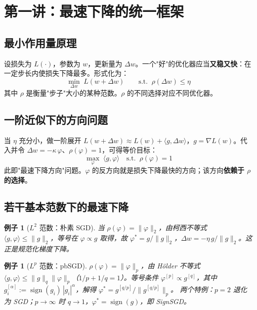 \documentclass[11pt,a4paper]{article}
\theoremstyle{mythm}
\theoremstyle{mydef}
\newtheorem{example}[theorem]{例子}
\newcommand{\sign}{\operatorname{sign}}
\newcommand{\inner}[2]{\langle #1, #2 \rangle}
\begin{document}
\section{第一讲：最速下降的统一框架}\label{sec:framework}

\subsection{最小作用量原理}

设损失为 $L(\cdot)$，参数为 $w$，更新量为 $\Delta w$。一个"好"的优化器应当\textbf{又稳又快}：在一定步长内使损失下降最多。形式化为：
\begin{equation}\label{eq:min-action}
\min_{\Delta w}\; L(w+\Delta w)
\qquad
\text{s.t.}\;\; \rho(\Delta w)\le \eta
\end{equation}
其中 $\rho$ 是衡量"步子"大小的某种范数。$\rho$ 的不同选择对应不同优化器。

\subsection{一阶近似下的方向问题}

当 $\eta$ 充分小，做一阶展开 $L(w+\Delta w)\approx L(w)+\inner{g}{\Delta w}$，$g=\nabla L(w)$。代入并令 $\Delta w = -\kappa\,\varphi$、$\rho(\varphi)=1$，可得等价目标：
\begin{equation}\label{eq:direction}
\boxed{\quad\max_\varphi\; \inner{g}{\varphi}\quad \text{s.t.}\;\; \rho(\varphi)=1\quad}
\end{equation}
此即"最速下降方向"问题。$\varphi$ 的反方向就是损失下降最快的方向；该方向\textbf{依赖于 $\rho$ 的选择}。

\subsection{若干基本范数下的最速下降}

\begin{example}[$L^2$ 范数：朴素 SGD]
当 $\rho(\varphi) = \|\varphi\|_2$，由柯西不等式 $\inner{g}{\varphi}\le \|g\|_2$，等号在 $\varphi \propto g$ 取得，故
$\varphi^\ast = g/\|g\|_2$，$\Delta w = -\eta\,g/\|g\|_2$。这正是规范化梯度下降。
\end{example}

\begin{example}[$L^p$ 范数：pbSGD]
$\rho(\varphi) = \|\varphi\|_p$，由 Hölder 不等式 $\inner{g}{\varphi}\le \|g\|_q\|\varphi\|_p$（$1/p+1/q=1$）。等号条件 $\varphi^{[p]} \propto g^{[q]}$，其中 $g^{[\alpha]}_i := \sign(g_i)\,|g_i|^\alpha$，解得
$\varphi^\ast = g^{[q/p]}/\|g^{[q/p]}\|_p$。
两个特例：$p=2$ 退化为 SGD；$p\to\infty$ 时 $q\to 1$，$\varphi^\ast = \sign(g)$，即 SignSGD。
\end{example}
\end{document}
